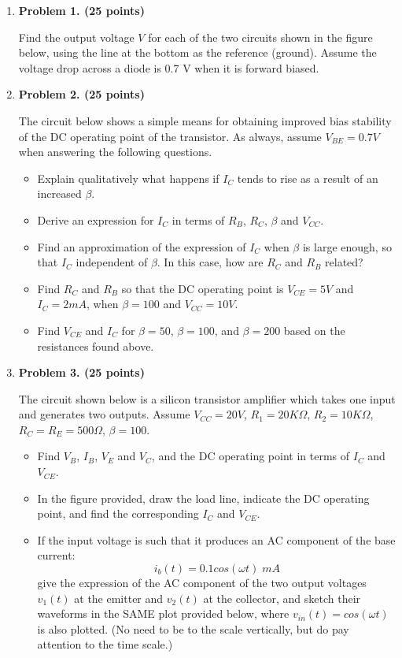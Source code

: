 \begin{enumerate}

\item {\bf Problem 1. (25 points)} 

Find the output voltage $V$ for each of the two circuits shown in the 
figure below, using the line at the bottom as the reference (ground).
Assume the voltage drop across a diode is 0.7 V when it is forward
biased.


\item {\bf Problem 2. (25 points)} 

The circuit below shows a simple means for obtaining improved bias
stability of the DC operating point of the transistor. As always,
assume $V_{BE}=0.7V$ when answering the following questions.


\begin{itemize}
\item Explain qualitatively what happens if $I_C$ tends to rise as a
  result of an increased $\beta$.
\item Derive an expression for $I_C$ in terms of $R_B$, $R_C$, $\beta$
  and $V_{CC}$.
\item Find an approximation of the expression of $I_C$ when $\beta$ is 
  large enough, so that $I_C$ independent of $\beta$. In this case, how 
  are $R_C$ and $R_B$ related?
\item Find $R_C$ and $R_B$ so that the DC operating point is $V_{CE}=5V$ 
and $I_C=2mA$, when $\beta=100$ and $V_{CC}=10V$. 
\item Find $V_{CE}$ and $I_C$ for $\beta=50$, $\beta=100$, and $\beta=200$
	based on the resistances found above.
\end{itemize}

\item {\bf Problem 3. (25 points)} 


The circuit shown below is a silicon transistor amplifier which takes one
input and generates two outputs. Assume $V_{CC}=20V$, $R_1=20K\Omega$,
$R_2=10K\Omega$, $R_C=R_E=500\Omega$, $\beta=100$. 

\begin{itemize}
\item Find $V_B$, $I_B$, $V_E$ and $V_C$, and the DC operating point in 
terms of $I_C$ and $V_{CE}$. 
\item In the figure provided, draw the load line, indicate the DC operating 
point, and find the corresponding $I_C$ and $V_{CE}$.
\item If the input voltage is such that it produces an AC component of the 
base current:
\[	i_b(t)=0.1 cos(\omega t) \; mA	\]
give the expression of the AC component of the two output voltages $v_1(t)$ 
at the emitter and $v_2(t)$ at the collector, and sketch their waveforms in 
the SAME plot provided below, where $v_{in}(t)=cos(\omega t)$ is also plotted.
(No need to be to the scale vertically, but do pay attention to the time
scale.)
\end{itemize}


\end{enumerate}
